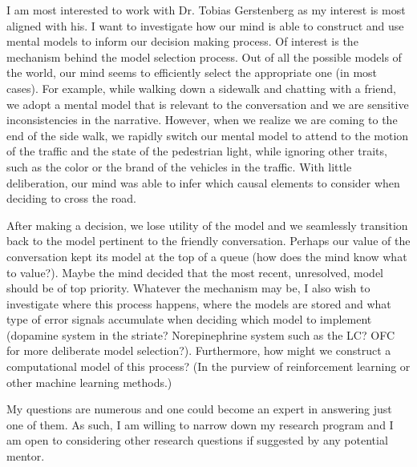 \documentclass[12pt]{article}
\begin{document}
	I am most interested to work with Dr. Tobias Gerstenberg as my interest is most aligned with his. I want to investigate how our mind is able to construct and use mental models to inform our decision making process. Of interest is the mechanism behind the model selection process. Out of all the possible models of the world, our mind seems to efficiently select the appropriate one (in most cases). For example, while walking down a sidewalk and chatting with a friend, we adopt a mental model that is relevant to the conversation and we are sensitive inconsistencies in the narrative. However, when we realize we are coming to the end of the side walk, we rapidly switch our mental model to attend to the motion of the traffic and the state of the pedestrian light, while ignoring other traits, such as the color or the brand of the vehicles in the traffic. With little deliberation, our mind was able to infer which causal elements to consider when deciding to cross the road.
	
	After making a decision, we lose utility of the model and we seamlessly transition back to the model pertinent to the friendly conversation. Perhaps our value of the conversation kept its model at the top of a queue (how does the mind know what to value?). Maybe the mind decided that the most recent, unresolved, model should be of top priority. Whatever the mechanism may be, I also wish to investigate where this process happens, where the models are stored and what type of error signals accumulate when deciding which model to implement (dopamine system in the striate? Norepinephrine system such as the LC? OFC for more deliberate model selection?). Furthermore, how might we construct a computational model of this process? (In the purview of reinforcement learning or other machine learning methods.)
	
	My questions are numerous and one could become an expert in answering just one of them. As such, I am willing to narrow down my research program and I am open to considering other research questions if suggested by any potential mentor.
	
\end{document}
